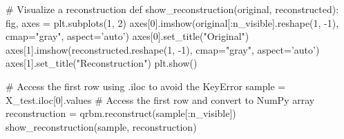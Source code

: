 \documentclass[%
oneside,                 %
final,                   %
10pt]{article}
\begin{document}
# Visualize a reconstruction
def show_reconstruction(original, reconstructed):
    fig, axes = plt.subplots(1, 2)
    axes[0].imshow(original[:n_visible].reshape(1, -1), cmap="gray", aspect='auto')
    axes[0].set_title("Original")
    axes[1].imshow(reconstructed.reshape(1, -1), cmap="gray", aspect='auto')
    axes[1].set_title("Reconstruction")
    plt.show()

# Access the first row using .iloc to avoid the KeyError
sample = X_test.iloc[0].values # Access the first row and convert to NumPy array
reconstruction = qrbm.reconstruct(sample[:n_visible])
show_reconstruction(sample, reconstruction)


\epycod



\end{document}
